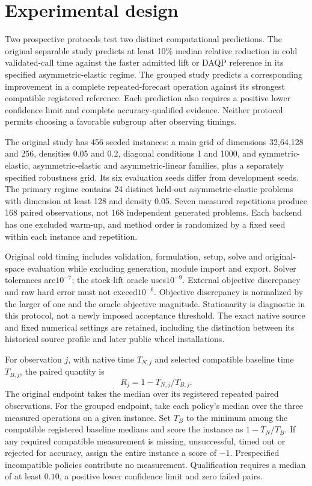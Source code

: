 \section{Experimental design}\label{sec:design}
Two prospective protocols test two distinct computational predictions.
The original separable study predicts at least 10\% median relative
reduction in cold validated-call time against the faster admitted lift
or DAQP reference in its specified asymmetric-elastic regime. The
grouped study predicts a corresponding improvement in a complete
repeated-forecast operation against its strongest compatible registered
reference. Each prediction also requires a positive lower confidence
limit and complete accuracy-qualified evidence. Neither protocol permits
choosing a favorable subgroup after observing timings.

The original study has 456 seeded instances: a main grid of dimensions
32,64,128 and 256, densities 0.05 and 0.2, diagonal conditions 1 and 1000,
and symmetric-elastic, asymmetric-elastic and asymmetric-linear
families, plus a separately specified robustness grid. Its six
evaluation seeds differ from development seeds. The primary regime
contains 24 distinct held-out asymmetric-elastic problems with dimension
at least 128 and density 0.05. Seven measured repetitions produce 168
paired observations, not 168 independent generated problems. Each backend
has one excluded warm-up, and method order is randomized by a fixed
seed within each instance and repetition.

Original cold timing includes validation, formulation, setup, solve
and original-space evaluation while excluding generation, module
import and export. Solver tolerances are$10^{-7}$; the stock-lift
oracle uses$10^{-9}$. External objective discrepancy and raw hard
error must not exceed$10^{-6}$. Objective discrepancy is normalized
by the larger of one and the oracle objective magnitude. Stationarity
is diagnostic in this protocol, not a newly imposed acceptance threshold.
The exact native source and fixed numerical settings are retained,
including the distinction between its historical source profile and
later public wheel installations.

For observation $j$, with native time $T_{N,j}$ and selected compatible
baseline time $T_{B,j}$, the paired quantity is
\begin{equation}\label{eq:paper-reduction}
 R_j=1-T_{N,j}/T_{B,j}.
\end{equation}
The original endpoint takes the median over its registered repeated
paired observations. For the grouped endpoint, take each policy's
median over the three measured operations on a given instance. Set
$T_B$ to the minimum among the compatible registered baseline medians
and score the instance as $1-T_N/T_B$. If any required compatible
measurement is missing, unsuccessful, timed out or rejected for
accuracy, assign the entire instance a score of $-1$. Prespecified
incompatible policies contribute no measurement. Qualification requires
a median of at least $0.10$, a positive lower confidence limit and zero
failed pairs.

